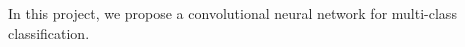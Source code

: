 \documentclass[twoside,twocolumn,10.8pt]{article}
\begin{document}
In this project, we propose a convolutional neural network for multi-class classification. 














 

\end{document}
